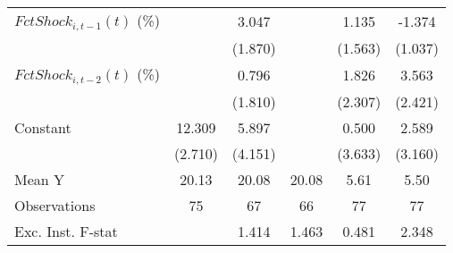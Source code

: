 {\begin{tabular}{l*{5}{c}}
\addlinespace
$ FctShock_{i,t-1}(t)$ (\%)&                     &       3.047         &                     &       1.135         &      -1.374         \\
                    &                     &     (1.870)         &                     &     (1.563)         &     (1.037)         \\
\addlinespace
$ FctShock_{i,t-2}(t)$ (\%)&                     &       0.796         &                     &       1.826         &       3.563         \\
                    &                     &     (1.810)         &                     &     (2.307)         &     (2.421)         \\
\addlinespace
Constant            &      12.309\sym{***}&       5.897         &                     &       0.500         &       2.589         \\
                    &     (2.710)         &     (4.151)         &                     &     (3.633)         &     (3.160)         \\
\midrule
Mean Y              &       20.13         &       20.08         &       20.08         &        5.61         &        5.50         \\
Observations        &          75         &          67         &          66         &          77         &          77         \\
Exc. Inst. F-stat   &                     &       1.414         &       1.463         &       0.481         &       2.348         \\
\bottomrule
\end{tabular}
}
